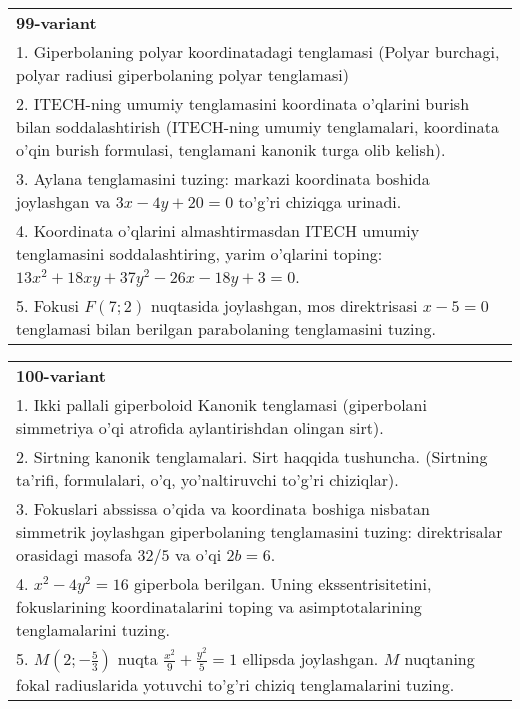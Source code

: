 \documentclass{article}
\begin{document}
\begin{tabular}{m{17cm}}
\textbf{99-variant}\\
1. Giperbolaning polyar koordinatadagi tenglamasi (Polyar burchagi, polyar radiusi giperbolaning polyar tenglamasi)\\

2. ITECH-ning umumiy tenglamasini koordinata o'qlarini burish bilan soddalashtirish (ITECH-ning umumiy tenglamalari, koordinata o'qin burish formulasi, tenglamani kanonik turga olib kelish).\\

3. Aylana tenglamasini tuzing: markazi koordinata boshida joylashgan va $3x-4y+20=0$ to'g'ri chiziqga urinadi.\\

4. Koordinata o'qlarini almashtirmasdan ITECH umumiy tenglamasini soddalashtiring, yarim o'qlarini toping: $13x^{2} + 18xy + 37y^{2} - 26x - 18y + 3 = 0$.  \\

5. Fokusi $F(7;2)$ nuqtasida joylashgan, mos direktrisasi $x - 5 = 0$ tenglamasi bilan berilgan parabolaning tenglamasini tuzing.  
\end{tabular}
\vspace{1cm}


\begin{tabular}{m{17cm}}
\textbf{100-variant}\\
1. Ikki pallali giperboloid Kanonik tenglamasi (giperbolani simmetriya o'qi atrofida aylantirishdan olingan sirt).\\

2. Sirtning kanonik tenglamalari. Sirt haqqida tushuncha. (Sirtning ta'rifi, formulalari, o'q, yo'naltiruvchi to'g'ri chiziqlar).\\

3. Fokuslari abssissa o'qida va koordinata boshiga nisbatan simmetrik joylashgan giperbolaning tenglamasini tuzing: direktrisalar orasidagi masofa $32/5$ va o'qi $2b=6$.\\

4. $x^{2} - 4y^{2} = 16$ giperbola berilgan. Uning ekssentrisitetini, fokuslarining koordinatalarini toping va asimptotalarining tenglamalarini tuzing.\\

5. $M(2; - \frac{5}{3})$ nuqta $\frac{x^{2}}{9} + \frac{y^{2}}{5} = 1$ ellipsda joylashgan. $M$ nuqtaning fokal radiuslarida yotuvchi to'g'ri chiziq tenglamalarini tuzing.  
\end{tabular}
\vspace{1cm}
\end{document}
